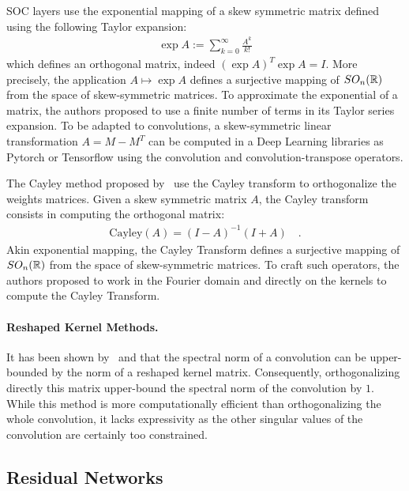 SOC layers use the exponential mapping of a skew symmetric matrix defined using the following Taylor expansion:
\begin{align*}
  \exp{A}:=\sum_{k=0}^{\infty}\frac{A^k}{k!}
\end{align*}
which defines an orthogonal matrix, indeed $(\exp{A})^T\exp{A}=I$. More precisely, the application $A\mapsto\exp{A}$ defines a surjective mapping of $SO_n(\mathbb{R})$ from the space of skew-symmetric matrices. To approximate the exponential of a matrix, the authors proposed to use a finite number of terms in its Taylor series expansion.  To be adapted to convolutions, a skew-symmetric linear transformation $A = M-M^T$ can be  computed in a Deep Learning libraries as Pytorch or Tensorflow using the  convolution and convolution-transpose operators.



The Cayley method proposed by~\citet{trockman2021orthogonalizing} use the Cayley transform to orthogonalize the weights matrices. Given a skew symmetric matrix $A$, the Cayley transform consists in computing the orthogonal matrix:
\begin{align*}
   \text{Cayley}(A)= (I - A)^{-1} (I + A) \quad.
\end{align*}
Akin exponential mapping, the Cayley Transform defines  a surjective mapping of $SO_n(\mathbb{R})$ from the space of skew-symmetric matrices. To craft such operators, the authors proposed to work in the Fourier domain and directly on the kernels to compute the Cayley Transform.

\paragraph{Reshaped Kernel Methods.}
It has been shown by~\citet{cisse2017parseval} and \citet{tsuzuku2018lipschitz} that the spectral norm of a convolution can be upper-bounded by the norm of a reshaped kernel matrix. Consequently, orthogonalizing directly this matrix upper-bound the spectral norm of the convolution by $1$.
While this method is more computationally efficient than orthogonalizing the whole convolution, it lacks expressivity as the other singular values of the convolution are certainly too constrained. 



\subsection{Residual Networks}

